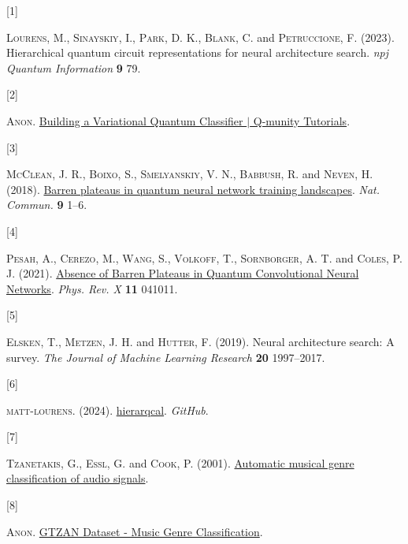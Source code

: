 \documentclass[
  13pt,
  a4paper,
  DIV=11,
  numbers=noendperiod,
  oneside]{scrreprt}
\newlength{\cslhangindent}
\newlength{\csllabelwidth}
\newenvironment{CSLReferences}[2] %
 {\begin{list}{}{%
  \setlength{\itemindent}{0pt}
  \setlength{\leftmargin}{0pt}
  \setlength{\parsep}{0pt}
  \ifodd #1
   \setlength{\leftmargin}{\cslhangindent}
   \setlength{\itemindent}{-1\cslhangindent}
  \fi
  \setlength{\itemsep}{#2\baselineskip}}}
 {\end{list}}
\newcommand{\CSLLeftMargin}[1]{\parbox[t]{\csllabelwidth}{\strut#1\strut}}
\newcommand{\CSLRightInline}[1]{\parbox[t]{\linewidth - \csllabelwidth}{\strut#1\strut}}
\begin{document}
\label{refs}
\begin{CSLReferences}{0}{1}
\CSLLeftMargin{{[}1{]} }%
\CSLRightInline{\textsc{Lourens}, M., \textsc{Sinayskiy}, I.,
\textsc{Park}, D. K., \textsc{Blank}, C. and \textsc{Petruccione}, F.
(2023). Hierarchical quantum circuit representations for neural
architecture search. \emph{npj Quantum Information} \textbf{9} 79.}

\CSLLeftMargin{{[}2{]} }%
\CSLRightInline{\textsc{Anon}.
\href{https://www.qmunity.tech/tutorials/building-a-variational-quantum-classifier}{{Building
a Variational Quantum Classifier {\(\vert\)} Q-munity Tutorials}}.}

\CSLLeftMargin{{[}3{]} }%
\CSLRightInline{\textsc{McClean}, J. R., \textsc{Boixo}, S.,
\textsc{Smelyanskiy}, V. N., \textsc{Babbush}, R. and \textsc{Neven}, H.
(2018). \href{https://doi.org/10.1038/s41467-018-07090-4}{{Barren
plateaus in quantum neural network training landscapes}}. \emph{Nat.
Commun.} \textbf{9} 1--6.}

\CSLLeftMargin{{[}4{]} }%
\CSLRightInline{\textsc{Pesah}, A., \textsc{Cerezo}, M., \textsc{Wang},
S., \textsc{Volkoff}, T., \textsc{Sornborger}, A. T. and \textsc{Coles},
P. J. (2021). \href{https://doi.org/10.1103/PhysRevX.11.041011}{{Absence
of Barren Plateaus in Quantum Convolutional Neural Networks}}.
\emph{Phys. Rev. X} \textbf{11} 041011.}

\CSLLeftMargin{{[}5{]} }%
\CSLRightInline{\textsc{Elsken}, T., \textsc{Metzen}, J. H. and
\textsc{Hutter}, F. (2019). Neural architecture search: A survey.
\emph{The Journal of Machine Learning Research} \textbf{20} 1997--2017.}

\CSLLeftMargin{{[}6{]} }%
\CSLRightInline{\textsc{matt-lourens}. (2024).
\href{https://github.com/matt-lourens/hierarqcal?tab=readme-ov-file}{{hierarqcal}}.
\emph{GitHub}.}

\CSLLeftMargin{{[}7{]} }%
\CSLRightInline{\textsc{Tzanetakis}, G., \textsc{Essl}, G. and
\textsc{Cook}, P. (2001).
\href{http://ismir2001.ismir.net/pdf/tzanetakis.pdf}{Automatic musical
genre classification of audio signals}.}

\CSLLeftMargin{{[}8{]} }%
\CSLRightInline{\textsc{Anon}.
\href{https://www.kaggle.com/datasets/andradaolteanu/gtzan-dataset-music-genre-classification?resource=download}{{GTZAN
Dataset - Music Genre Classification}}.}


\end{CSLReferences}
\end{document}
